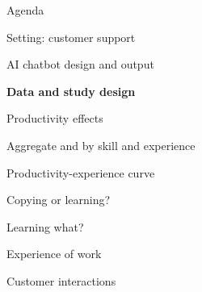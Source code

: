 \documentclass[aspectratio=169,t,11pt,table]{beamer}
\begin{document}

\begin{frame}{Agenda}
\be
\item \textcolor{asher}{Setting: customer support}
\bi 
\item \textcolor{asher}{AI chatbot design and output}
\ei 
\medskip
\item \textbf{Data and study design}
\medskip 
\item Productivity effects
\bi
\item Aggregate and by skill and experience
\item Productivity-experience curve
\item Copying or learning?
\item Learning what?
\ei 
\medskip
\item Experience of work
\bi 
\item Customer interactions
\ei 
\ee 
\end{frame} 
\end{document}
